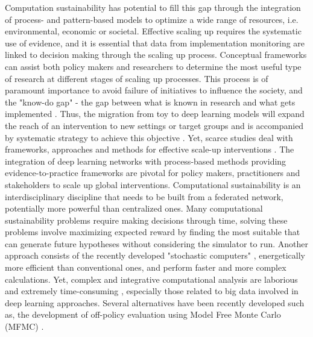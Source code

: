 \documentclass[12pt,a4paper]{article}
\begin{document}
Computation sustainability has potential to fill this gap through the integration of process- and pattern-based models to optimize a wide range of resources, i.e. environmental, economic or societal. Effective scaling up requires the systematic use of evidence, and it is essential that data from implementation monitoring are linked to decision making through the scaling up process. Conceptual frameworks can assist both policy makers and researchers to determine the most useful type of research at different stages of scaling up processes. This process is of paramount importance to avoid failure of initiatives to influence the society, and the "know-do gap" - the gap between what is known in research and what gets implemented \cite{catford2009advancing}. Thus, the migration from toy to deep learning models will expand the reach of an intervention to new settings or target groups and is accompanied by systematic strategy to achieve this objective \cite{milat2014increasing}. Yet, scarce studies deal with frameworks, approaches and methods for effective scale-up interventions \cite{wigboldus2013towards, yamey2012barriers}. The integration of deep learning networks with process-based methods providing evidence-to-practice frameworks are pivotal for policy makers, practitioners and stakeholders to scale up global interventions. Computational sustainability is an interdisciplinary discipline that needs to be built from a federated network, potentially more powerful than centralized ones. Many computational sustainability problems require making decisions through time, solving these problems involve maximizing expected reward by finding the most suitable that can generate future hypotheses without considering the simulator to run. Another approach consists of the recently developed "stochastic computers" \cite{borders2019integer}, energetically more efficient than conventional ones, and perform faster and more complex calculations. Yet, complex and integrative computational analysis are laborious and extremely time-consuming \cite{rodrigues2014integrative}, especially those related to big data involved in deep learning approaches. Several alternatives have been recently developed such as, the development of off-policy evaluation using Model Free Monte Carlo (MFMC) \cite{fontenpoeau2010model}. 

\end{document}
